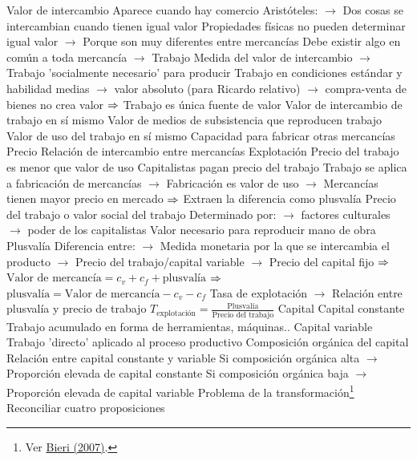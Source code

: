 \documentclass{nuevotema}
\begin{document}
\begin{esquemal}
				\4 Valor de intercambio
				\4[] Aparece cuando hay comercio
				\4[] Aristóteles:
				\4[] $\to$ Dos cosas se intercambian cuando tienen igual valor
				\4[] Propiedades físicas no pueden determinar igual valor
				\4[] $\to$ Porque son muy diferentes entre mercancías
				\4[] Debe existir algo en común a toda mercancía
				\4[] $\to$ Trabajo
				\4[] Medida del valor de intercambio
				\4[] $\to$ Trabajo 'socialmente necesario' para producir
				\4[] Trabajo en condiciones estándar y habilidad medias
				\4[] $\to$ valor absoluto (para Ricardo relativo)
				\4[] $\to$ compra-venta de bienes no crea valor
				\4[] $\Rightarrow$ Trabajo es única fuente de valor
				\4 Valor de intercambio de trabajo en sí mismo
				\4[] Valor de medios de subsistencia que reproducen trabajo
				\4 Valor de uso del trabajo en sí mismo
				\4[] Capacidad para fabricar otras mercancías
				\4 Precio
				\4[] Relación de intercambio entre mercancías
			\3 Explotación
				\4 Precio del trabajo es menor que valor de uso
				\4[] Capitalistas pagan precio del trabajo
				\4[] Trabajo se aplica a fabricación de mercancías
				\4[] $\to$ Fabricación es valor de uso
				\4[] $\to$ Mercancías tienen mayor precio en mercado
				\4[] $\Rightarrow$ Extraen la diferencia como plusvalía
				\4 Precio del trabajo o valor social del trabajo
				\4[] Determinado por:
				\4[] $\to$ factores culturales
				\4[] $\to$ poder de los capitalistas
				\4[] Valor necesario para reproducir mano de obra
				\4 Plusvalía
				\4[] Diferencia entre:
				\4[] $\to$ Medida monetaria por la que se intercambia el producto
				\4[] $\to$ Precio del trabajo/capital variable
				\4[] $\to$ Precio del capital fijo
				\4[] $\Rightarrow$ $\text{Valor de mercancía} = c_v + c_f + \text{plusvalía}$
				\4[] $\Rightarrow$ $\text{plusvalía} = \text{Valor de mercancía} - c_v - c_f$
				\4 Tasa de explotación
				\4[] $\to$ Relación entre plusvalía y precio de trabajo
				\4[] $T_\text{explotación} = \frac{\text{Plusvalía}}{\text{Precio del trabajo}}$
			\3 Capital
				\4 Capital constante
				\4[] Trabajo acumulado en forma de herramientas, máquinas..
				\4 Capital variable
				\4[] Trabajo 'directo' aplicado al proceso productivo
				\4 Composición orgánica del capital
				\4[] Relación entre capital constante y variable
				\4[] Si composición orgánica alta
				\4[] $\to$ Proporción elevada de capital constante
				\4[] Si composición orgánica baja
				\4[] $\to$ Proporción elevada de capital variable
			\3 Problema de la transformación\footnote{Ver \href{https://core.ac.uk/reader/190866304}{Bieri (2007)}.}
				\4 Reconciliar cuatro proposiciones

\end{esquemal}
\end{document}
